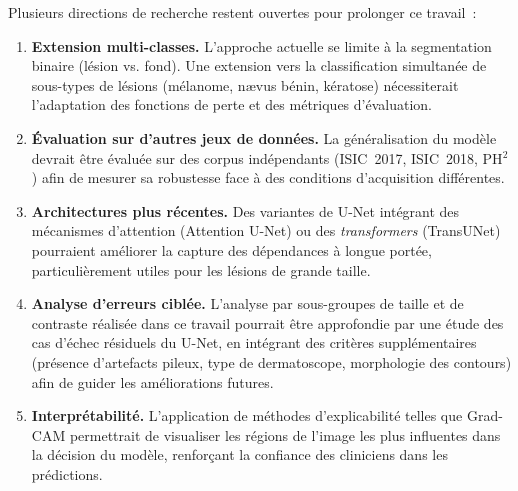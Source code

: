 \documentclass[12pt,a4paper]{article}
\begin{document}
Plusieurs directions de recherche restent ouvertes pour prolonger ce travail~:

\begin{enumerate}
    \item \textbf{Extension multi-classes.} L'approche actuelle se limite à la segmentation binaire (lésion vs. fond). Une extension vers la classification simultanée de sous-types de lésions (mélanome, n\ae vus bénin, kératose) nécessiterait l'adaptation des fonctions de perte et des métriques d'évaluation.

    \item \textbf{Évaluation sur d'autres jeux de données.} La généralisation du modèle devrait être évaluée sur des corpus indépendants (ISIC~2017, ISIC~2018, PH$^2$) afin de mesurer sa robustesse face à des conditions d'acquisition différentes.

    \item \textbf{Architectures plus récentes.} Des variantes de U-Net intégrant des mécanismes d'attention (Attention U-Net) ou des \emph{transformers} (TransUNet) pourraient améliorer la capture des dépendances à longue portée, particulièrement utiles pour les lésions de grande taille.

    \item \textbf{Analyse d'erreurs ciblée.} L'analyse par sous-groupes de taille et de contraste réalisée dans ce travail pourrait être approfondie par une étude des cas d'échec résiduels du U-Net, en intégrant des critères supplémentaires (présence d'artefacts pileux, type de dermatoscope, morphologie des contours) afin de guider les améliorations futures.

    \item \textbf{Interprétabilité.} L'application de méthodes d'explicabilité telles que Grad-CAM \citep{selvaraju2017gradcam} permettrait de visualiser les régions de l'image les plus influentes dans la décision du modèle, renforçant la confiance des cliniciens dans les prédictions.
\end{enumerate}


\newpage

\end{document}
